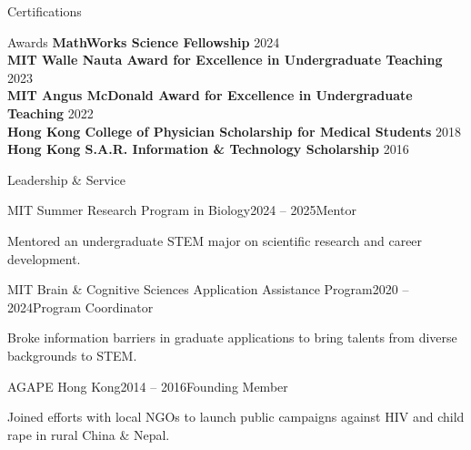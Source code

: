 \documentclass{resume} %
\begin{document}
\begin{rSection}{Certifications}

\end{rSection}

\begin{rSection}{Awards}
\textbf{MathWorks Science Fellowship} \hfill 2024 \\
\textbf{MIT Walle Nauta Award for Excellence in Undergraduate Teaching} \hfill 2023 \\
\textbf{MIT Angus McDonald Award for Excellence in Undergraduate Teaching} \hfill 2022 \\
\textbf{Hong Kong College of Physician Scholarship for Medical Students} \hfill 2018 \\
\textbf{Hong Kong S.A.R. Information \& Technology Scholarship} \hfill 2016 \\
\end{rSection}
\vspace{-1em}

\begin{rSection}{Leadership \& Service}
\begin{rSubsection}{MIT Summer Research Program in Biology}{2024 -- 2025}{Mentor}{}
    \item Mentored an undergraduate STEM major on scientific research and career development.
\end{rSubsection}

\begin{rSubsection}{MIT Brain \& Cognitive Sciences Application Assistance Program}{2020 -- 2024}{Program Coordinator}{}
    \item Broke information barriers in graduate applications to bring talents from diverse backgrounds to STEM.
\end{rSubsection}

\begin{rSubsection}{AGAPE Hong Kong}{2014 -- 2016}{Founding Member}{}
    \item Joined efforts with local NGOs to launch public campaigns against HIV and child rape in rural China \& Nepal.
\end{rSubsection}

\end{rSection}
\end{document}
